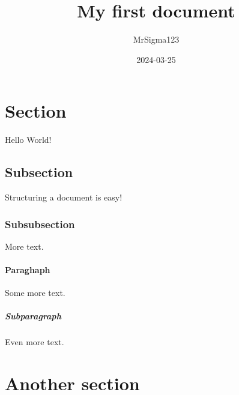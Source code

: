 \documentclass{article}
\title{My first document}
\date{2024-03-25}
\author{MrSigma123}
\begin{document}
	\maketitle
	\newpage
	
	\section{Section}
	
	Hello World!
	
	\subsection{Subsection}
	
	Structuring a document is easy!
	
	\subsubsection{Subsubsection}
	
	More text.
	
	\paragraph{Paraghaph}
	
	Some more text.
	
	\subparagraph{Subparagraph}
	
	Even more text.
	
	\section{Another section}
\end{document}
